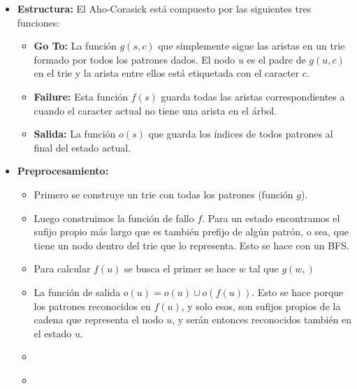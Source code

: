 \begin{itemize}
    \item{
		\textbf{Estructura:}
		El Aho-Corasick est\'a compuesto por las siguientes tres funciones:
		\begin{itemize}
			\item{
				\textbf{Go To:}
				La funci\'on $g(s, c)$ que simplemente sigue las aristas en un trie formado por todos los 
				patrones dados. El nodo $u$ es el padre de $g(u, c)$ en el trie y la arista entre ellos 
				est\'a etiquetada con el caracter $c$.
			}
			\item{
				\textbf{Failure:}
				Esta funci\'on $f(s)$ guarda todas las aristas correspondientes a cuando el caracter actual 
				no tiene una arista en el \'arbol.
		    }
		    \item{
				\textbf{Salida:}
				La funci\'on $o(s)$ que guarda los \'indices de todos patrones al final del estado actual. 
		    }
		\end{itemize} 
    }
    \item{
		\textbf{Preprocesamiento:}
		
		\begin{itemize}
			\item{
				Primero se construye un trie con todas los patrones (funci\'on $g$). 
			}
			\item{
			    Luego construimos la funci\'on de fallo $f$. Para un estado encontramos el sufijo propio 
			    m\'as largo que es tambi\'en prefijo de alg\'un patr\'on, o sea, que tiene un nodo
			    dentro del trie que lo representa. Esto se hace con un BFS. 
			}
			\item{
				Para calcular $f(u)$ se busca el primer se hace $w$ tal que $g(w, )$ 	
			}
			\item{
				La funci\'on de salida $o(u) = o(u) \cup o(f(u))$. Esto se hace porque los patrones reconocidos 
				en $f(u)$, y solo esos, son sufijos propios de la cadena que representa el nodo $u$, y ser\'an
				entonces reconocidos tambi\'en en el estado $u$.  
			}
			\item{
				\textbf{}
				
			}
			\item{
				\textbf{}
				
			}
		\end{itemize} 
    }
\end{itemize}
